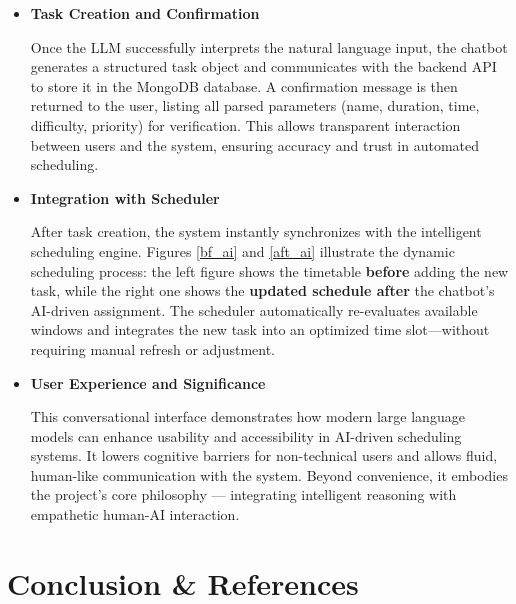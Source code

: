 \documentclass[12pt, a4paper]{article}
\begin{document}
\begin{enumerate}
\begin{itemize}
                        \item \textbf{Task Creation and Confirmation}  
                
                            Once the LLM successfully interprets the natural language input, the chatbot generates a structured task object and communicates with the backend API to store it in the MongoDB database. A confirmation message is then returned to the user, listing all parsed parameters (name, duration, time, difficulty, priority) for verification. This allows transparent interaction between users and the system, ensuring accuracy and trust in automated scheduling.
                        
                        \item \textbf{Integration with Scheduler}  
                        
                            After task creation, the system instantly synchronizes with the intelligent scheduling engine.  
                            Figures \ref{bf_ai} and \ref{aft_ai} illustrate the dynamic scheduling process: the left figure shows the timetable \textbf{before} adding the new task, while the right one shows the \textbf{updated schedule after} the chatbot’s AI-driven assignment.  
                            The scheduler automatically re-evaluates available windows and integrates the new task into an optimized time slot—without requiring manual refresh or adjustment.
                        
                        \item \textbf{User Experience and Significance}  
                        
                            This conversational interface demonstrates how modern large language models can enhance usability and accessibility in AI-driven scheduling systems. It lowers cognitive barriers for non-technical users and allows fluid, human-like communication with the system. Beyond convenience, it embodies the project’s core philosophy — integrating intelligent reasoning with empathetic human-AI interaction.
                            
                    \end{itemize}
                
            \end{enumerate}



\section{Conclusion \& References}
\end{document}
